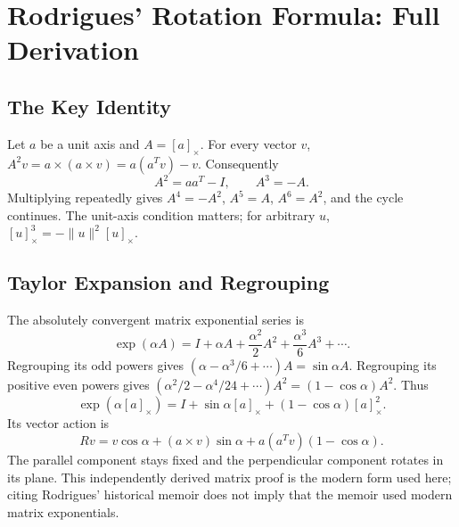 \section{Rodrigues' Rotation Formula: Full Derivation}
\label{sec:rodrigues}

\subsection{The Key Identity}
\label{thm:skew_cubic}

Let $a$ be a unit axis and $A=[a]_\times$. For every vector $v$, $A^2v=a\times(a\times v)=a(a^Tv)-v$. Consequently
\begin{equation}
 A^2=aa^T-I,\qquad A^3=-A.
 \label{eq:skew_squared}
\end{equation}
\label{eq:skew_cubic}
Multiplying repeatedly gives $A^4=-A^2$, $A^5=A$, $A^6=A^2$, and the cycle continues. The unit-axis condition matters; for arbitrary $u$, $[u]_\times^3=-\|u\|^2[u]_\times$.
\label{eq:skew_power_cycle}

\subsection{Taylor Expansion and Regrouping}
\label{thm:rodrigues_formula}

The absolutely convergent matrix exponential series is
\begin{equation}
 \exp(\alpha A)=I+\alpha A+\frac{\alpha^2}{2}A^2+\frac{\alpha^3}{6}A^3+\cdots.
 \label{eq:exp_taylor}
\end{equation}
Regrouping its odd powers gives $(\alpha-\alpha^3/6+\cdots)A=\sin\alpha A$. Regrouping its positive even powers gives $(\alpha^2/2-\alpha^4/24+\cdots)A^2=(1-\cos\alpha)A^2$. Thus
\begin{equation}
 \exp(\alpha[a]_\times)=I+\sin\alpha[a]_\times+(1-\cos\alpha)[a]_\times^2.
 \label{eq:rodrigues}
\end{equation}
Its vector action is
\begin{equation}
 Rv=v\cos\alpha+(a\times v)\sin\alpha+a(a^Tv)(1-\cos\alpha).
 \label{eq:rodrigues_vector}
\end{equation}
The parallel component stays fixed and the perpendicular component rotates in its plane. This independently derived matrix proof is the modern form used here; citing Rodrigues' historical memoir does not imply that the memoir used modern matrix exponentials.

